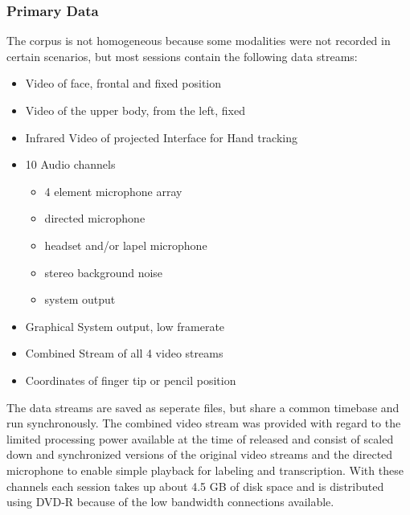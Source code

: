 \documentclass[a4paper]{article}
\begin{document}
		\subsubsection{Primary Data}
			The corpus is not homogeneous because some modalities were not recorded in certain scenarios, but most sessions contain the following data streams:
			\begin{itemize}
			\item Video of face, frontal and fixed position
			\item Video of the upper body, from the left, fixed
			\item Infrared Video of projected Interface for Hand tracking
			\item 10 Audio channels
			\begin{itemize}
				\item 4 element microphone array
				\item directed microphone
				\item headset and/or lapel microphone
				\item stereo background noise 
				\item system output
			\end{itemize}
			\item Graphical System output, low framerate
			\item Combined Stream of all 4 video streams
			\item Coordinates of finger tip or pencil position		
			\end{itemize} 
			The data streams are saved as seperate files, but share a common timebase and run synchronously. The combined video stream was provided with regard to the limited processing power available at the time of released and consist of scaled down and synchronized versions of the original video streams and the directed microphone to enable simple playback for labeling and transcription.  
			With these channels each session takes up about 4.5 GB of disk space and is distributed using DVD-R because of the low bandwidth connections available.
		
\end{document}

